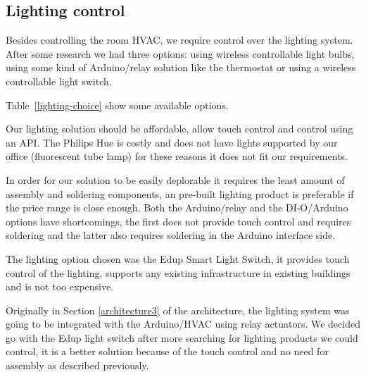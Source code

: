 \subsection{Lighting control}
Besides controlling the room \ac{HVAC}, we require control over the lighting system. After some research we had three options: using wireless controllable light bulbs, using some kind of Arduino/relay solution like the thermostat or using a wireless controllable light switch.

Table~\ref{lighting-choice} show some available options.

Our lighting solution should be affordable, allow touch control and control using an API. The Philips Hue is costly and does not have lights supported by our office (fluorescent tube lamp) for these reasons it does not fit our requirements.

In order for our solution to be easily deplorable it requires the least amount of assembly and soldering components, an pre-built lighting product is preferable if the price range is close enough. Both the Arduino/relay and the DI-O/Arduino options have shortcomings, the first does not provide touch control and requires soldering and the latter also requires soldering in the Arduino interface side.

The lighting option chosen was the Edup Smart Light Switch, it provides touch control of the lighting, supports any existing infrastructure in existing buildings and is not too expensive.


Originally in Section \ref{architecture3} of the architecture, the lighting system was going to be integrated with the Arduino/\ac{HVAC} using relay actuators. We decided go with the Edup light switch after more searching for lighting products we could control, it is a better solution because of the touch control and no need for assembly as described previously.

